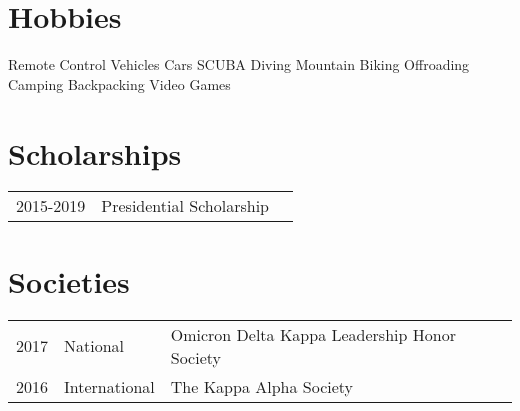 \documentclass[]{deedy-resume-openfont}
\begin{document}

\section{Hobbies} 
Remote Control Vehicles \textbullet{} Cars \textbullet{} SCUBA Diving \textbullet{} Mountain Biking \textbullet{} Offroading \textbullet{} Camping \textbullet{} Backpacking \textbullet{} Video Games
\sectionsep{}



\section{Scholarships} 
\begin{tabular}{rll}
2015-2019	     & Presidential Scholarship\\
\end{tabular}
\sectionsep


\section{Societies} 

\begin{tabular}{rll}
2017   & National		& Omicron Delta Kappa Leadership Honor Society\\
2016   & International   & The Kappa Alpha Society\\
\end{tabular}
\sectionsep

\end{document}
